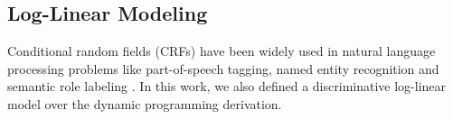 %
%
%


\subsection{Log-Linear Modeling}
Conditional random fields (CRFs)\cite{lafferty2001conditional} have been widely used in natural language processing problems like part-of-speech tagging, named entity recognition \cite{mccallum2003early} and semantic role labeling \cite{cohn2005semantic}. 
In this work, we also defined a discriminative log-linear model over the dynamic programming derivation. 

